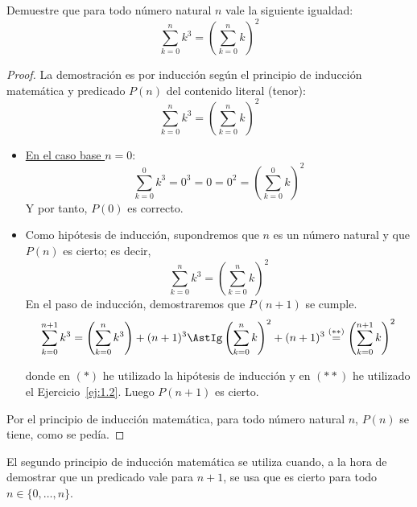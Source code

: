 \begin{ejercicio}
    Demuestre que para todo número natural $n$ vale la siguiente igualdad:
    $$\sum_{k=0}^n k^3 = \left(\sum_{k=0}^n k\right)^2$$
\begin{proof}
    La demostración es por inducción según el principio de inducción matemática y predicado $P(n)$ del contenido literal (tenor):
    $$\sum_{k=0}^n k^3 = \left(\sum_{k=0}^n k\right)^2$$
    \begin{itemize}
        \item \ul{En el caso base $n = 0$}:
        $$\sum_{k=0}^0 k^3 = 0^3 = 0 = 0^2 = \left(\sum_{k=0}^0 k\right)^2$$
        Y por tanto, $P(0)$ es correcto.
        
        \item Como hipótesis de inducción, supondremos que $n$ es un número natural y que $P(n)$ es cierto; es decir, 
        $$\sum_{k=0}^{n} k^3 = \left(\sum_{k=0}^n k\right)^2$$
        En el paso de inducción, demostraremos que $P(n+1)$ se cumple.
        $$\sum_{k=0}^{n+1} k^3 = \left(\sum_{k=0}^n k^3\right) + (n+1)^3 \AstIg \left(\sum_{k=0}^n k\right)^2 + (n+1)^3 \stackrel{(\ast\ast)}{=} \left(\sum_{k=0}^{n+1} k\right)^2  $$

        donde en $(\ast)$ he utilizado la hipótesis de inducción y en $(\ast\ast)$ he utilizado el Ejercicio~\ref{ej:1.2}.
        Luego $P(n+1)$ es cierto.
    \end{itemize}
    Por el principio de inducción matemática, para todo número natural $n$, $P(n)$ se tiene, como se pedía.
\end{proof}
\end{ejercicio}

\begin{observacion}
    El segundo principio de inducción matemática se utiliza cuando, a la hora de demostrar que un predicado vale para $n+1$,
    se usa que es cierto para todo $n\in \{0,\dots,n\}$.
\end{observacion}

